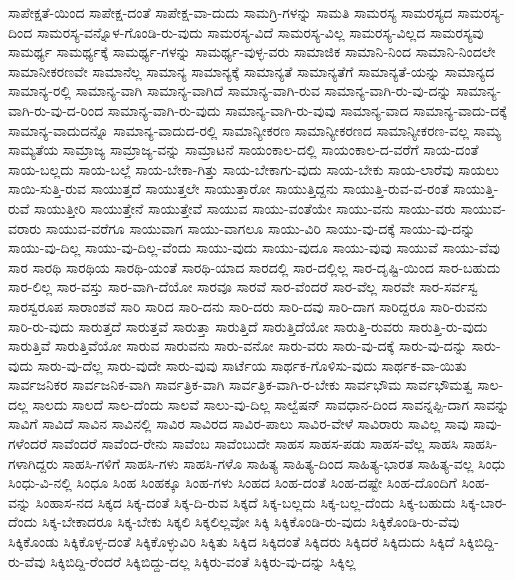 {ಸಾಪೇಕ್ಷತೆ-ಯಿಂದ
ಸಾಪೇಕ್ಷ-ದಂತೆ
ಸಾಪೇಕ್ಷ-ವಾ-ದುದು
ಸಾಮಗ್ರಿ-ಗಳನ್ನು
ಸಾಮತಿ
ಸಾಮರಸ್ಯ
ಸಾಮರಸ್ಯದ
ಸಾಮರಸ್ಯ-ದಿಂದ
ಸಾಮರಸ್ಯ-ವನ್ನೊಳ-ಗೊಂಡಿ-ರು-ವುದು
ಸಾಮರಸ್ಯ-ವಿದೆ
ಸಾಮರಸ್ಯ-ವಿಲ್ಲ
ಸಾಮರಸ್ಯ-ವಿಲ್ಲದ
ಸಾಮರಸ್ಯವು
ಸಾಮರ್ಥ್ಯ
ಸಾಮರ್ಥ್ಯಕ್ಕೆ
ಸಾಮರ್ಥ್ಯ-ಗಳನ್ನು
ಸಾಮರ್ಥ್ಯ-ವುಳ್ಳ-ವರು
ಸಾಮಾಜಿಕ
ಸಾಮಾನಿ-ನಿಂದ
ಸಾಮಾನಿ-ನಿಂದಲೇ
ಸಾಮಾನೀಕರಣವೇ
ಸಾಮಾನೆಲ್ಲ
ಸಾಮಾನ್ಯ
ಸಾಮಾನ್ಯಕ್ಕೆ
ಸಾಮಾನ್ಯತೆ
ಸಾಮಾನ್ಯತೆಗೆ
ಸಾಮಾನ್ಯತೆ-ಯನ್ನು
ಸಾಮಾನ್ಯದ
ಸಾಮಾನ್ಯ-ರಲ್ಲಿ
ಸಾಮಾನ್ಯ-ವಾಗಿ
ಸಾಮಾನ್ಯ-ವಾಗಿದೆ
ಸಾಮಾನ್ಯ-ವಾಗಿ-ರುವ
ಸಾಮಾನ್ಯ-ವಾಗಿ-ರು-ವು-ದನ್ನು
ಸಾಮಾನ್ಯ-ವಾಗಿ-ರು-ವು-ದ-ರಿಂದ
ಸಾಮಾನ್ಯ-ವಾಗಿ-ರು-ವುದು
ಸಾಮಾನ್ಯ-ವಾಗಿ-ರು-ವುವು
ಸಾಮಾನ್ಯ-ವಾದ
ಸಾಮಾನ್ಯ-ವಾದು-ದಕ್ಕೆ
ಸಾಮಾನ್ಯ-ವಾದುದನ್ನೊ
ಸಾಮಾನ್ಯ-ವಾದುದ-ರಲ್ಲಿ
ಸಾಮಾನ್ಯೀಕರಣ
ಸಾಮಾನ್ಯೀಕರಣದ
ಸಾಮಾನ್ಯೀಕರಣ-ವಲ್ಲ
ಸಾಮ್ಯ
ಸಾಮ್ಯತೆಯ
ಸಾಮ್ರಾಜ್ಯ
ಸಾಮ್ರಾಜ್ಯ-ವನ್ನು
ಸಾಮ್ರಾಟನೆ
ಸಾಯಂಕಾಲ-ದಲ್ಲಿ
ಸಾಯಂಕಾಲ-ದ-ವರೆಗೆ
ಸಾಯ-ದಂತೆ
ಸಾಯ-ಬಲ್ಲದು
ಸಾಯ-ಬಲ್ಲೆ
ಸಾಯ-ಬೇಕಾ-ಗಿತ್ತು
ಸಾಯ-ಬೇಕಾಗು-ವುದು
ಸಾಯ-ಬೇಕು
ಸಾಯ-ಲಾರೆವು
ಸಾಯಲು
ಸಾಯಿ-ಸುತ್ತಿ-ರುವ
ಸಾಯುತ್ತದೆ
ಸಾಯುತ್ತಲೇ
ಸಾಯುತ್ತಾರೋ
ಸಾಯುತ್ತಿದ್ದನು
ಸಾಯುತ್ತಿ-ರುವ-ವ-ರಂತೆ
ಸಾಯುತ್ತಿ-ರುವೆ
ಸಾಯುತ್ತೀರಿ
ಸಾಯುತ್ತೇನೆ
ಸಾಯುತ್ತೇವೆ
ಸಾಯುವ
ಸಾಯು-ವಂತೆಯೇ
ಸಾಯು-ವನು
ಸಾಯು-ವರು
ಸಾಯುವ-ವರಾರು
ಸಾಯುವ-ವರೆಗೂ
ಸಾಯುವಾಗ
ಸಾಯು-ವಾಗಲೂ
ಸಾಯು-ವಿರಿ
ಸಾಯು-ವು-ದಕ್ಕೆ
ಸಾಯು-ವು-ದನ್ನು
ಸಾಯು-ವು-ದಿಲ್ಲ
ಸಾಯು-ವು-ದಿಲ್ಲ-ವೆಂದು
ಸಾಯು-ವುದು
ಸಾಯು-ವುದೂ
ಸಾಯು-ವುವು
ಸಾಯುವೆ
ಸಾಯು-ವೆವು
ಸಾರ
ಸಾರಥಿ
ಸಾರಥಿಯ
ಸಾರಥಿ-ಯಂತೆ
ಸಾರಥಿ-ಯಾದ
ಸಾರದಲ್ಲಿ
ಸಾರ-ದಲ್ಲಿಲ್ಲ
ಸಾರ-ದೃಷ್ಟಿ-ಯಿಂದ
ಸಾರ-ಬಹುದು
ಸಾರ-ಲಿಲ್ಲ
ಸಾರ-ವಸ್ತು
ಸಾರ-ವಾಗಿ-ದೆಯೋ
ಸಾರವೂ
ಸಾರವೆ
ಸಾರ-ವೆಂದರೆ
ಸಾರ-ವೆಲ್ಲ
ಸಾರವೇ
ಸಾರ-ಸರ್ವಸ್ವ
ಸಾರಸ್ವರೂಪ
ಸಾರಾಂಶವೆ
ಸಾರಿ
ಸಾರಿದ
ಸಾರಿ-ದನು
ಸಾರಿ-ದರು
ಸಾರಿ-ದವು
ಸಾರಿ-ದಾಗ
ಸಾರಿದ್ದರೂ
ಸಾರಿ-ರುವನು
ಸಾರಿ-ರು-ವುದು
ಸಾರುತ್ತದೆ
ಸಾರುತ್ತವೆ
ಸಾರುತ್ತಾ
ಸಾರುತ್ತಿದೆ
ಸಾರುತ್ತಿದೆಯೋ
ಸಾರುತ್ತಿ-ರುವರು
ಸಾರುತ್ತಿ-ರು-ವುದು
ಸಾರುತ್ತಿವೆ
ಸಾರುತ್ತಿವೆಯೋ
ಸಾರುವ
ಸಾರುವನು
ಸಾರು-ವನೋ
ಸಾರು-ವರು
ಸಾರು-ವು-ದಕ್ಕೆ
ಸಾರು-ವು-ದನ್ನು
ಸಾರು-ವುದು
ಸಾರು-ವು-ದೆಲ್ಲ
ಸಾರು-ವುದೇ
ಸಾರು-ವುವು
ಸಾರ್ಟೆಯ
ಸಾರ್ಥಕ-ಗೊಳಿಸು-ವುದು
ಸಾರ್ಥಕ-ವಾ-ಯಿತು
ಸಾರ್ವಜನಿಕರ
ಸಾರ್ವಜನಿಕ-ವಾಗಿ
ಸಾರ್ವತ್ರಿಕ-ವಾಗಿ
ಸಾರ್ವತ್ರಿಕ-ವಾಗಿ-ರ-ಬೇಕು
ಸಾರ್ವಭೌಮ
ಸಾರ್ವಭೌಮತ್ವ
ಸಾಲ-ದಲ್ಲ
ಸಾಲದು
ಸಾಲದೆ
ಸಾಲ-ದೆಂದು
ಸಾಲವೆ
ಸಾಲು-ವು-ದಿಲ್ಲ
ಸಾಲ್ವೆಷನ್
ಸಾವಧಾನ-ದಿಂದ
ಸಾವನ್ನಪ್ಪಿ-ದಾಗ
ಸಾವನ್ನು
ಸಾವಿಗೆ
ಸಾವಿದೆ
ಸಾವಿನ
ಸಾವಿನಲ್ಲಿ
ಸಾವಿರ
ಸಾವಿರದ
ಸಾವಿರ-ಪಾಲು
ಸಾವಿರ-ವೇಳೆ
ಸಾವಿರಾರು
ಸಾವಿಲ್ಲ
ಸಾವು
ಸಾವು-ಗಳೆಂದರೆ
ಸಾವೆಂದರೆ
ಸಾವೆಂದ-ರೇನು
ಸಾವೆಂಬ
ಸಾವೆಂಬುದೇ
ಸಾಹಸ
ಸಾಹಸ-ಪಡು
ಸಾಹಸ-ವೆಲ್ಲ
ಸಾಹಸಿ
ಸಾಹಸಿ-ಗಳಾಗಿದ್ದರು
ಸಾಹಸಿ-ಗಳಿಗೆ
ಸಾಹಸಿ-ಗಳು
ಸಾಹಸಿ-ಗಳೊ
ಸಾಹಿತ್ಯ
ಸಾಹಿತ್ಯ-ದಿಂದ
ಸಾಹಿತ್ಯ-ಭಾರತ
ಸಾಹಿತ್ಯ-ವಲ್ಲ
ಸಿಂಧು
ಸಿಂಧು-ವಿ-ನಲ್ಲಿ
ಸಿಂಧೂ
ಸಿಂಹ
ಸಿಂಹಕ್ಕೂ
ಸಿಂಹ-ಗಳು
ಸಿಂಹದ
ಸಿಂಹ-ದಂತೆ
ಸಿಂಹ-ದಷ್ಟೇ
ಸಿಂಹ-ದೊಂದಿಗೆ
ಸಿಂಹ-ವನ್ನು
ಸಿಂಹಾಸ-ನದ
ಸಿಕ್ಕದ
ಸಿಕ್ಕ-ದಂತೆ
ಸಿಕ್ಕ-ದಿ-ರುವ
ಸಿಕ್ಕದೆ
ಸಿಕ್ಕ-ಬಲ್ಲದು
ಸಿಕ್ಕ-ಬಲ್ಲ-ದೆಂದು
ಸಿಕ್ಕ-ಬಹುದು
ಸಿಕ್ಕ-ಬಾರ-ದೆಂದು
ಸಿಕ್ಕ-ಬೇಕಾದರೂ
ಸಿಕ್ಕ-ಬೇಕು
ಸಿಕ್ಕಲಿ
ಸಿಕ್ಕಲಿಲ್ಲವೋ
ಸಿಕ್ಕಿ
ಸಿಕ್ಕಿಕೊಂಡಿ-ರು-ವುದು
ಸಿಕ್ಕಿಕೊಂಡಿ-ರು-ವೆವು
ಸಿಕ್ಕಿಕೊಂಡು
ಸಿಕ್ಕಿಕೊಳ್ಳ-ದಂತೆ
ಸಿಕ್ಕಿಕೊಳ್ಳುವಿರಿ
ಸಿಕ್ಕಿತು
ಸಿಕ್ಕಿದ
ಸಿಕ್ಕಿದಂತೆ
ಸಿಕ್ಕಿದರು
ಸಿಕ್ಕಿದರೆ
ಸಿಕ್ಕಿದುದು
ಸಿಕ್ಕಿದೆ
ಸಿಕ್ಕಿಬಿದ್ದಿ-ರು-ವೆವು
ಸಿಕ್ಕಿಬಿದ್ದಿ-ರೆಂದರೆ
ಸಿಕ್ಕಿಬಿದ್ದು-ದಲ್ಲ
ಸಿಕ್ಕಿರು-ವಂತೆ
ಸಿಕ್ಕಿರು-ವು-ದನ್ನು
ಸಿಕ್ಕಿಲ್ಲ
}
